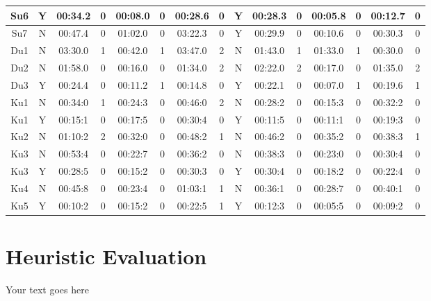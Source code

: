 \documentclass[a4paper,12pt]{article}
\begin{document}
\begin{center}
\begin{tabular}{|c|c|c|c|c|c|c|c|c|c|c|c|c|c|c|}
Su6&Y&00:34.2&0&00:08.0&0&00:28.6&0&Y&00:28.3&0&00:05.8&0&00:12.7&0\\ \hline
Su7&N&00:47.4&0&01:02.0&0&03:22.3&0&Y&00:29.9&0&00:10.6&0&00:30.3&0\\ \hline
Du1&N&03:30.0&1&00:42.0&1&03:47.0&2&N&01:43.0&1&01:33.0&1&00:30.0&0\\ \hline
Du2&N&01:58.0&0&00:16.0&0&01:34.0&2&N&02:22.0&2&00:17.0&0&01:35.0&2\\ \hline
Du3&Y&00:24.4&0&00:11.2&1&00:14.8&0&Y&00:22.1&0&00:07.0&1&00:19.6&1\\ \hline
Ku1&N&00:34:0&1&00:24:3&0&00:46:0&2&N&00:28:2&0&00:15:3&0&00:32:2&0\\ \hline
Ku1&Y&00:15:1&0&00:17:5&0&00:30:4&0&Y&00:11:5&0&00:11:1&0&00:19:3&0\\ \hline
Ku2&N&01:10:2&2&00:32:0&0&00:48:2&1&N&00:46:2&0&00:35:2&0&00:38:3&1\\ \hline
Ku3&N&00:53:4&0&00:22:7&0&00:36:2&0&N&00:38:3&0&00:23:0&0&00:30:4&0\\ \hline
Ku3&Y&00:28:5&0&00:15:2&0&00:30:3&0&Y&00:30:4&0&00:18:2&0&00:22:4&0\\ \hline
Ku4&N&00:45:8&0&00:23:4&0&01:03:1&1&N&00:36:1&0&00:28:7&0&00:40:1&0\\ \hline
Ku5&Y&00:10:2&0&00:15:2&0&00:22:5&1&Y&00:12:3&0&00:05:5&0&00:09:2&0\\ \hline
\end{tabular}
\end{center}
\section{Heuristic Evaluation}

Your text goes here
\end{document}
